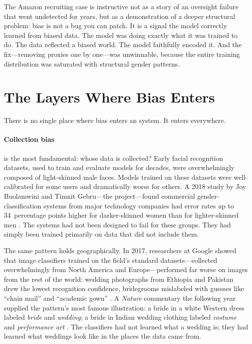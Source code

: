 The Amazon recruiting case is instructive not as a story of an oversight failure that went undetected for years, but as a demonstration of a deeper structural problem: bias is not a bug you can patch. It is a signal the model correctly learned from biased data. The model was doing exactly what it was trained to do. The data reflected a biased world. The model faithfully encoded it. And the fix---removing proxies one by one---was unwinnable, because the entire training distribution was saturated with structural gender patterns.

\section{The Layers Where Bias Enters}
\label{sec:ch14-bias-layers}

There is no single place where bias enters an \ai system. It enters everywhere.

\paragraph{Collection bias} is the most fundamental: whose data is collected? Early facial recognition datasets, used to train and evaluate models for decades, were overwhelmingly composed of light-skinned male faces. Models trained on these datasets were well-calibrated for some users and dramatically worse for others. A 2018 study by Joy Buolamwini and Timnit Gebru---the  project---found commercial gender-classification systems from major technology companies had error rates up to 34~percentage points higher for darker-skinned women than for lighter-skinned men \autocite{buolamwini2018gender}. The systems had not been designed to fail for these groups. They had simply been trained primarily on data that did not include them.

The same pattern holds geographically. In 2017, researchers at Google showed that image classifiers trained on the field's standard datasets---collected overwhelmingly from North America and Europe---performed far worse on images from the rest of the world: wedding photographs from Ethiopia and Pakistan drew the lowest recognition confidence, bridegrooms mislabeled with guesses like ``chain mail'' and ``academic gown'' \autocite{shankar2017geodiversity}. A \textit{Nature} commentary the following year supplied the pattern's most famous illustration: a bride in a white Western dress labeled \emph{bride} and \emph{wedding}; a bride in Indian wedding clothing labeled \emph{costume} and \emph{performance art} \autocite{zou2018ai}. The classifiers had not learned what a wedding is; they had learned what weddings look like in the places the data came from.

